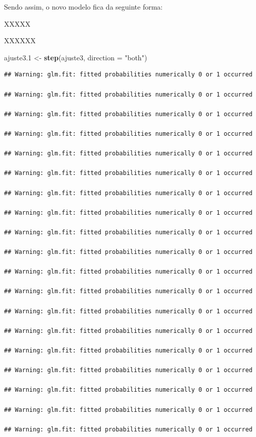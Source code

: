 \documentclass[]{article}
\newenvironment{Shaded}{\begin{snugshade}}{\end{snugshade}}
\newcommand{\KeywordTok}[1]{\textcolor[rgb]{0.13,0.29,0.53}{\textbf{#1}}}
\newcommand{\DataTypeTok}[1]{\textcolor[rgb]{0.13,0.29,0.53}{#1}}
\newcommand{\FloatTok}[1]{\textcolor[rgb]{0.00,0.00,0.81}{#1}}
\newcommand{\StringTok}[1]{\textcolor[rgb]{0.31,0.60,0.02}{#1}}
\newcommand{\NormalTok}[1]{#1}
\begin{document}
Sendo assim, o novo modelo fica da seguinte forma:

XXXXX

XXXXXX

\begin{Shaded}
\begin{Highlighting}[]
\NormalTok{ajuste3}\FloatTok{.1}\NormalTok{ <-}\StringTok{ }\KeywordTok{step}\NormalTok{(ajuste3, }\DataTypeTok{direction =} \StringTok{"both"}\NormalTok{)}
\end{Highlighting}
\end{Shaded}

\begin{verbatim}
## Warning: glm.fit: fitted probabilities numerically 0 or 1 occurred

## Warning: glm.fit: fitted probabilities numerically 0 or 1 occurred

## Warning: glm.fit: fitted probabilities numerically 0 or 1 occurred

## Warning: glm.fit: fitted probabilities numerically 0 or 1 occurred

## Warning: glm.fit: fitted probabilities numerically 0 or 1 occurred

## Warning: glm.fit: fitted probabilities numerically 0 or 1 occurred

## Warning: glm.fit: fitted probabilities numerically 0 or 1 occurred

## Warning: glm.fit: fitted probabilities numerically 0 or 1 occurred

## Warning: glm.fit: fitted probabilities numerically 0 or 1 occurred

## Warning: glm.fit: fitted probabilities numerically 0 or 1 occurred

## Warning: glm.fit: fitted probabilities numerically 0 or 1 occurred

## Warning: glm.fit: fitted probabilities numerically 0 or 1 occurred

## Warning: glm.fit: fitted probabilities numerically 0 or 1 occurred

## Warning: glm.fit: fitted probabilities numerically 0 or 1 occurred

## Warning: glm.fit: fitted probabilities numerically 0 or 1 occurred

## Warning: glm.fit: fitted probabilities numerically 0 or 1 occurred

## Warning: glm.fit: fitted probabilities numerically 0 or 1 occurred

## Warning: glm.fit: fitted probabilities numerically 0 or 1 occurred

## Warning: glm.fit: fitted probabilities numerically 0 or 1 occurred
\end{verbatim}
\end{document}
